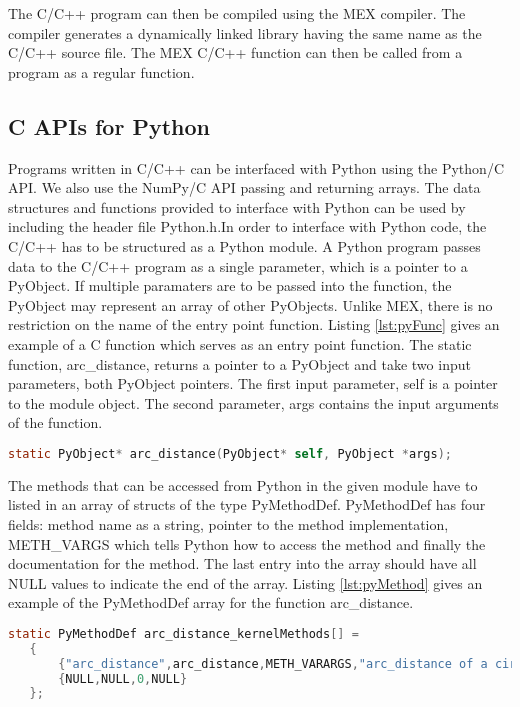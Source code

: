 The C/C++ program can then be compiled using the MEX compiler. The compiler generates a dynamically linked library having the same name as the C/C++ source file. The MEX C/C++ function can then be called from a \matlab program as a regular \matlab function. 

\subsection{C APIs for Python}
Programs written in C/C++ can be interfaced with Python using the Python/C API. We also use the NumPy/C API passing and returning arrays. The data structures and functions provided to interface with Python can be used by including the header file \textsf{Python.h}.In order to interface with Python code, the C/C++ has to be structured as a Python module. 
A Python program passes data to the C/C++ program as a single parameter, which is a pointer to a PyObject. If multiple paramaters are to be passed into the function, the PyObject may represent an array of other PyObjects. Unlike MEX, there is no restriction on the name of the entry point function. Listing \ref{lst:pyFunc} gives an example of a C function which serves as an entry point function. The static function, arc\_distance, returns a pointer to a PyObject and take two input parameters, both PyObject pointers. The first input parameter, \textsf{self} is a pointer to the module object. The second parameter, \textsf{args} contains the input arguments of the function. 
\begin{lstlisting}[float,language=C, label={lst:pyFunc}, caption={Signature of a function that can be called from Python}]
  static PyObject* arc_distance(PyObject* self, PyObject *args); 
\end{lstlisting}

The methods that can be accessed from Python in the given module have to listed in an array of structs of the type PyMethodDef. PyMethodDef has four fields: method name as a string, pointer to the method implementation, METH\_VARGS which tells Python how to access the method and finally the documentation for the method. The last entry into the array should have all NULL values to indicate the end of the array. Listing \ref{lst:pyMethod} gives an example of the PyMethodDef array for the function arc\_distance. 
\begin{lstlisting}[language=C, label={lst:pyMethod}, caption={An Example of the PyMethodDef struct }]
static PyMethodDef arc_distance_kernelMethods[] =
   {
       {"arc_distance",arc_distance,METH_VARARGS,"arc_distance of a circle. "},
       {NULL,NULL,0,NULL}
   };
\end{lstlisting}

